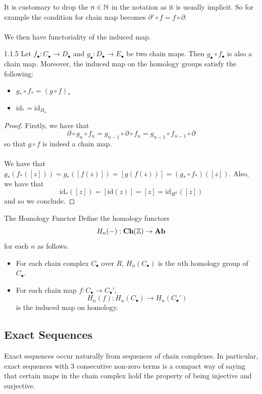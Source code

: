 \documentclass[a4paper]{article}
\begin{document}
It is customary to drop the $n\in\mathbb{N}$ in the notation as it is usually implicit. So for example the condition for chain map becomes $\partial'\circ f=f\circ\partial$. \\~\\

We then have functoriality of the induced map. 

\begin{prp}{}{1.1.5} Let $f_\bullet:C_\bullet\to D_\bullet$ and $g_\bullet:D_\bullet\to E_\bullet$ be two chain maps. Then $g_\bullet\circ f_\bullet$ is also a chain map. Moreover, the induced map on the homology groups satisfy the following: 
\begin{itemize}
\item $g_\ast\circ f_\ast=(g\circ f)_\ast$
\item $\text{id}_\ast=\text{id}_{H_n}$
\end{itemize} \tcbline
\begin{proof}
Firstly, we have that $$\partial\circ g_n\circ f_n=g_{n-1}\circ\partial\circ f_n=g_{n-1}\circ f_{n-1}\circ\partial$$ so that $g\circ f$ is indeed a chain map. \\~\\

We have that $g_\ast(f_\ast([z]))=g_\ast([f(z)])=[g(f(z))]=(g_\ast\circ f_\ast)([z])$. Also, we have that $$\text{id}_\ast([z])=[\text{id}(z)]=[z]=\text{id}_{H^n}([z])$$ and so we conclude. 
\end{proof}
\end{prp}

\begin{defn}{The Homology Functor}{} Define the homology functors $$H_n(-):\bold{Ch}(\mathbb{Z})\to\bold{Ab}$$ for each $n$ as follows. 
\begin{itemize}
\item For each chain complex $C_\bullet$ over $R$, $H_n(C_\bullet)$ is the $n$th homology group of $C_\bullet$. 
\item For each chain map $f:C_\bullet\to C_\bullet'$, $$H_n(f):H_n(C_\bullet)\to H_n(C_\bullet')$$ is the induced map on homology. 
\end{itemize}
\end{defn}

\subsection{Exact Sequences}
Exact sequences occur naturally from sequences of chain complexes. In particular, exact sequences with $3$ consecutive non-zero terms is a compact way of saying that certain maps in the chain complex hold the property of being injective and surjective. 
\end{document}
